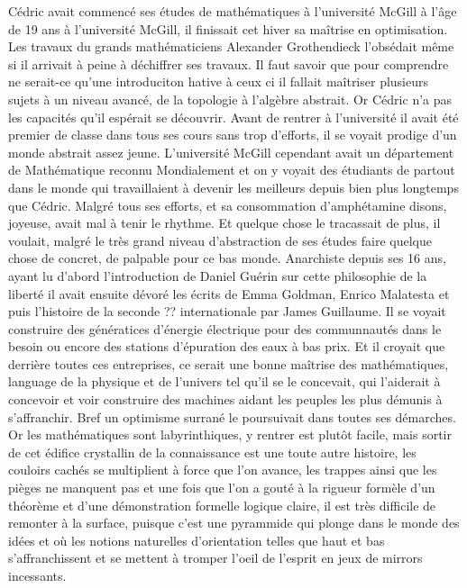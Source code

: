 \documentclass{article}
\begin{document}
Cédric avait commencé ses études de mathématiques à l'université McGill à l'âge
de 19 ans à l'université McGill, il finissait cet hiver sa maîtrise en
optimisation. Les travaux du grands mathématiciens Alexander Grothendieck
l'obsédait même si il arrivait à peine à déchiffrer ses travaux. Il faut savoir
que pour comprendre ne serait-ce qu'une introduciton hative à ceux ci il fallait
maîtriser plusieurs sujets à un niveau avancé, de la topologie à l'algèbre
abstrait. Or Cédric n'a pas les capacités qu'il espérait se découvrir. Avant de
rentrer à l'université il avait été premier de classe dans tous ses cours sans
trop d'efforts, il se voyait prodige d'un monde abstrait assez jeune.
L'université McGill cependant avait un département de Mathématique reconnu
Mondialement et on y voyait des étudiants de partout dans le monde qui
travaillaient à devenir les meilleurs depuis bien plus longtemps que Cédric.
Malgré tous ses efforts, et sa consommation d'amphétamine disons, joyeuse, avait
mal à tenir le rhythme. Et quelque chose le tracassait de plus, il voulait,
malgré le très grand niveau d'abstraction de ses études faire quelque chose de
concret, de palpable pour ce bas monde. Anarchiste depuis ses 16 ans, ayant lu
d'abord l'introduction de Daniel Guérin sur cette philosophie de la liberté il
avait ensuite dévoré les écrits de Emma Goldman, Enrico Malatesta et puis
l'histoire de la seconde ?? internationale par James Guillaume. Il se voyait
construire des génératices d'énergie électrique pour des communnautés dans le
besoin ou encore des stations d'épuration des eaux à bas prix. Et il croyait que
derrière toutes ces entreprises, ce serait une bonne maîtrise des mathématiques,
language de la physique et de l'univers tel qu'il se le concevait, qui
l'aiderait à concevoir et voir construire des machines aidant les peuples les
plus démunis à s'affranchir. Bref un optimisme surrané le poursuivait dans
toutes ses démarches.\\

Or les mathématiques sont labyrinthiques, y rentrer est plutôt facile, mais sortir
de cet édifice crystallin de la connaissance est une toute autre histoire, les couloirs
cachés se multiplient à force que l'on avance, les trappes ainsi que les pièges
ne manquent pas et une fois que l'on a gouté à la rigueur formèle d'un théorème
et d'une démonstration formelle logique claire, il est très difficile de remonter
à la surface, puisque c'est une pyrammide qui plonge dans le monde des idées et
où les notions naturelles d'orientation telles que haut et bas s'affranchissent
et se mettent à tromper l'oeil de l'esprit en jeux de mirrors incessants.\\
\end{document}
